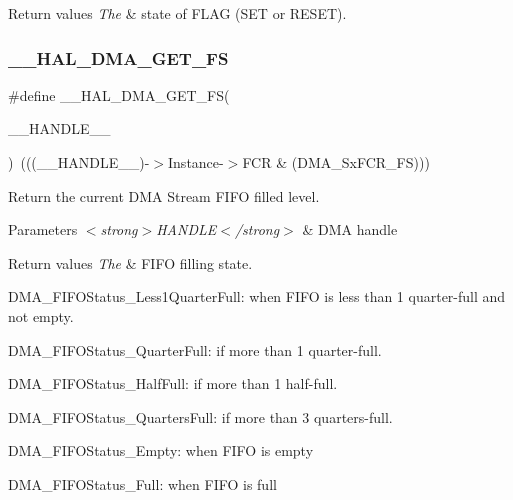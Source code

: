\begin{DoxyRetVals}{Return values}
{\em The} & state of F\+L\+AG (S\+ET or R\+E\+S\+ET). \\
\hline
\end{DoxyRetVals}
\mbox{\label{group___d_m_a_ga8f0ff408d25904040b9d23ee7f6af080}} 
\subsubsection{\texorpdfstring{\_\_HAL\_DMA\_GET\_FS}{\_\_HAL\_DMA\_GET\_FS}}
{\footnotesize\ttfamily \#define \+\_\+\+\_\+\+H\+A\+L\+\_\+\+D\+M\+A\+\_\+\+G\+E\+T\+\_\+\+FS(\begin{DoxyParamCaption}\item[{}]{\+\_\+\+\_\+\+H\+A\+N\+D\+L\+E\+\_\+\+\_\+ }\end{DoxyParamCaption})~(((\+\_\+\+\_\+\+H\+A\+N\+D\+L\+E\+\_\+\+\_\+)-\/$>$Instance-\/$>$F\+CR \& (D\+M\+A\+\_\+\+Sx\+F\+C\+R\+\_\+\+FS)))}



Return the current D\+MA Stream F\+I\+FO filled level. 


\begin{DoxyParams}{Parameters}
{\em $<$strong$>$\+H\+A\+N\+D\+L\+E$<$/strong$>$} & D\+MA handle \\
\hline
\end{DoxyParams}

\begin{DoxyRetVals}{Return values}
{\em The} & F\+I\+FO filling state.
\begin{DoxyItemize}
\item D\+M\+A\+\_\+\+F\+I\+F\+O\+Status\+\_\+\+Less1\+Quarter\+Full\+: when F\+I\+FO is less than 1 quarter-\/full and not empty.
\item D\+M\+A\+\_\+\+F\+I\+F\+O\+Status\+\_\+Quarter\+Full\+: if more than 1 quarter-\/full.
\item D\+M\+A\+\_\+\+F\+I\+F\+O\+Status\+\_\+\+Half\+Full\+: if more than 1 half-\/full.
\item D\+M\+A\+\_\+\+F\+I\+F\+O\+Status\+\_\+Quarters\+Full\+: if more than 3 quarters-\/full.
\item D\+M\+A\+\_\+\+F\+I\+F\+O\+Status\+\_\+\+Empty\+: when F\+I\+FO is empty
\item D\+M\+A\+\_\+\+F\+I\+F\+O\+Status\+\_\+\+Full\+: when F\+I\+FO is full 
\end{DoxyItemize}\\
\hline
\end{DoxyRetVals}
\mbox{\label{group___d_m_a_ga0095f5f3166a82bedc67744ac94acfba}} 
